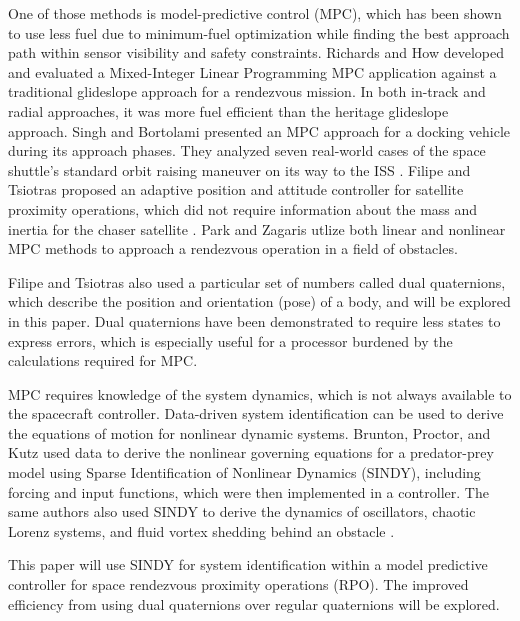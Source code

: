 \documentclass[letterpaper, preprint, paper,11pt]{AAS}	%
\begin{document}
One of those methods is model-predictive control (MPC), which has been shown to use less fuel due to minimum-fuel optimization while finding the best approach path within sensor visibility and safety constraints. Richards and How\cite{richards_how_MPC} developed and evaluated a Mixed-Integer Linear Programming MPC application against a traditional glideslope approach for a rendezvous mission. In both in-track and radial approaches, it was more fuel efficient than the heritage glideslope approach. Singh and Bortolami\cite{singh_bortolami_MPC} presented an MPC approach for a docking vehicle during its approach phases. They analyzed seven real-world cases of the space shuttle's standard orbit raising maneuver on its way to the ISS . Filipe and Tsiotras\cite{filipe_tsiotras_dualQ} proposed an adaptive position and attitude controller for satellite proximity operations, which did not require information about the mass and inertia for the chaser satellite . Park and Zagaris\cite{MPC_Park_Zagaris} utlize both linear and nonlinear MPC methods to approach a rendezvous operation in a field of obstacles. 

Filipe and Tsiotras also used a particular set of numbers called dual quaternions, which describe the position and orientation (pose) of a body, and will be explored in this paper. Dual quaternions have been demonstrated to require less states to express errors\cite{EKF_Filipe_Tsiotras}, which is especially useful for a processor burdened by the calculations required for MPC. 

MPC requires knowledge of the system dynamics, which is not always available to the spacecraft controller. Data-driven system identification can be used to derive the equations of motion for nonlinear dynamic systems. Brunton, Proctor, and Kutz\cite{brunton_proctor_SINDY} used data to derive the nonlinear governing equations for a predator-prey model using Sparse Identification of Nonlinear Dynamics (SINDY), including forcing and input functions, which were then implemented in a controller. The same authors\cite{provost_williams_SINDY} also used SINDY to derive the dynamics of oscillators, chaotic Lorenz systems, and fluid vortex shedding behind an obstacle . 

This paper will use SINDY for system identification within a model predictive controller for space rendezvous proximity operations (RPO). The improved efficiency from using dual quaternions over regular quaternions will be explored. 


\end{document}
